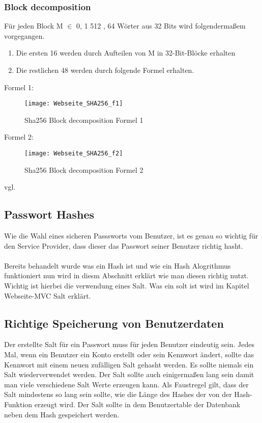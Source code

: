 {\subsubsection{Block decomposition}
\label{sec:hash_block_deco}
Für jeden Block M $\in$ {0, 1} 512 , 64 Wörter aus 32 Bits wird folgendermaßem vorgegangen. 
\begin{enumerate}
\item Die ersten 16 werden durch Aufteilen von M in 32-Bit-Blöcke erhalten
\item Die restlichen 48 werden durch folgende Formel erhalten.
\end{enumerate}
Formel 1:
\\
\begin{figure}[H]
    \texttt{[image: Webseite\_SHA256\_f1]}
    \caption{Sha256 Block decomposition Formel 1}
    \label{fig:sha256form1}
\end{figure}
Formel 2:\\
\begin{figure}[H]
    \texttt{[image: Webseite\_SHA256\_f2]}
    \caption{Sha256 Block decomposition Formel 2}
    \label{fig:sha256form2}
\end{figure}
vgl. \textcite{sha256}
\subsection{Passwort Hashes}
\label{sec:pwdhash}
Wie die Wahl eines sicheren Passsworts vom Benutzer, ist es genau so wichtig für den Service Provider, dass dieser das Passwort seiner Benutzer richtig hasht.\\ \\Bereits behandelt wurde was ein Hash ist und wie ein Hash Alogrithmus funktioniert nun wird in diesm Abschnitt erklärt wie man diesen richtig nutzt. Wichtig ist hierbei die verwendung eines Salt. Was ein solt ist wird im Kapitel Webseite-MVC Salt erklärt.
\subsection{Richtige Speicherung von Benutzerdaten}
Der erstellte Salt für ein Passwort muss für jeden Benutzer eindeutig sein. Jedes Mal, wenn ein Benutzer ein Konto erstellt oder sein Kennwort ändert, sollte das Kennwort mit einem neuen zufälligen Salt gehasht werden. Es sollte niemals ein Salt wiederverwendet werden. Der Salt sollte auch einigermaßen lang sein damit man viele verschiedene Salt Werte erzeugen kann. Als Faustregel gilt, dass der Salt mindestens so lang sein sollte, wie die Länge des Hashes der von der Hash-Funktion erzeugt wird. Der Salt sollte in dem Benutzertable der Datenbank neben dem Hash gespeichert werden.
}
